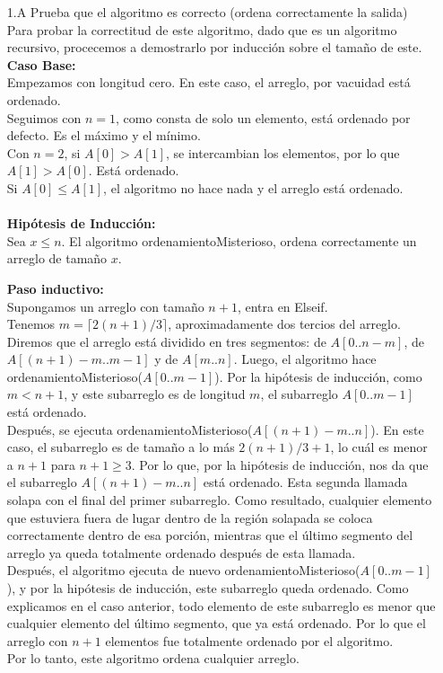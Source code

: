\documentclass[12pt]{article}
\begin{document}
\begin{itemize}
    \item[1.A] Prueba que el algoritmo es correcto (ordena correctamente la salida)\\
    Para probar la correctitud de este algoritmo, dado que es un algoritmo recursivo, procecemos a demostrarlo por inducción sobre el tamaño de este.
    \textbf{Caso Base:}\\
    Empezamos con longitud cero. En este caso, el arreglo, por vacuidad está ordenado.\\
    Seguimos con $n = 1$, como consta de solo un elemento, está ordenado por defecto. Es el máximo y el mínimo.\\
    Con $n = 2$, si $A[0] > A[1]$, se intercambian los elementos, por lo que $A[1] > A[0]$. Está ordenado.\\
    Si $A[0] \leq A[1]$, el algoritmo no hace nada y el arreglo está ordenado.\\\\
    \textbf{Hipótesis de Inducción:}\\
    Sea $x \leq n$. El algoritmo ordenamientoMisterioso, ordena correctamente un arreglo de tamaño $x$.

    \textbf{Paso inductivo:}\\
    Supongamos un arreglo con tamaño $n + 1$, entra en Elseif.\\
    Tenemos $m = \lceil 2(n + 1)/3\rceil$, aproximadamente dos tercios del arreglo. Diremos que el arreglo está dividido en tres segmentos: de $A[0..n-m]$, de $A[(n+1)-m..m-1]$ y de $A[m..n]$.
    Luego, el algoritmo hace ordenamientoMisterioso($A[0..m-1]$). Por la hipótesis de inducción, como $m < n + 1$, y este subarreglo es de longitud $m$, el subarreglo $A[0..m-1]$ está ordenado.\\
    Después, se ejecuta ordenamientoMisterioso($A[(n + 1) - m..n]$). En este caso, el subarreglo es de tamaño a lo más $2(n + 1)/3 + 1$, lo cuál es menor a $n + 1$ para $ n + 1 \geq 3$. Por lo que, por la hipótesis de inducción, nos da que el subarreglo $A[(n+1)-m..n]$ está ordenado.
    Esta segunda llamada solapa con el final del primer subarreglo. Como resultado, cualquier elemento que estuviera fuera de lugar dentro de la región solapada se coloca correctamente dentro de esa porción, mientras que el último segmento del arreglo ya queda totalmente ordenado después de esta llamada.
\\
    Después, el algoritmo ejecuta de nuevo ordenamientoMisterioso($A[0..m-1]$), y por la hipótesis de inducción, este subarreglo queda ordenado. Como explicamos en el caso anterior, todo elemento de este subarreglo es menor que cualquier elemento del último segmento, que ya está ordenado. Por lo que el arreglo con $n + 1$ elementos fue totalmente ordenado por el algoritmo.\\
    Por lo tanto, este algoritmo ordena cualquier arreglo.


\end{itemize}
\end{document}
